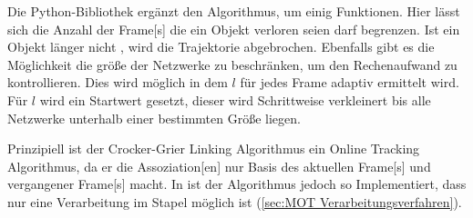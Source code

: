 Die \gls{Python}-\gls{Bibliothek} \cite{Allan.2023} ergänzt den Algorithmus, um einig Funktionen. Hier lässt sich die Anzahl der \gls{Frame}[s] die ein Objekt verloren seien darf begrenzen. Ist ein Objekt länger nicht , wird die \gls{Trajektorie} abgebrochen. Ebenfalls gibt es die Möglichkeit die größe der Netzwerke zu beschränken, um den Rechenaufwand zu kontrollieren. Dies wird möglich in dem \(l\) für jedes \gls{Frame} adaptiv ermittelt wird. Für \(l\) wird ein Startwert gesetzt, dieser wird Schrittweise verkleinert bis alle Netzwerke unterhalb einer bestimmten Größe liegen. \par

Prinzipiell ist der Crocker-Grier Linking Algorithmus ein \gls{Online Tracking} Algorithmus, da er die \gls{Assoziation}[en] nur Basis des aktuellen \gls{Frame}[s] und vergangener \gls{Frame}[s] macht. In \cite{Allan.2023} ist der Algorithmus jedoch so Implementiert, dass nur eine Verarbeitung im Stapel möglich ist (\autoref{sec:MOT Verarbeitungsverfahren}). 


